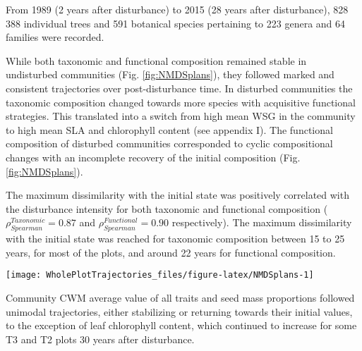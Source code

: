 \documentclass[fleqn,10pt]{ArtEcoFoG} %
\begin{document}
From 1989 (2 years after disturbance) to 2015 (28 years after
disturbance), 828 388 individual trees and 591 botanical species
pertaining to 223 genera and 64 families were recorded.

While both taxonomic and functional composition remained stable in
undisturbed communities (Fig. \ref{fig:NMDSplans}), they followed marked
and consistent trajectories over post-\break disturbance time. In
disturbed communities the taxonomic composition changed towards more
species with acquisitive functional strategies. This translated into a
switch from high mean WSG in the community to high mean SLA and
chlorophyll content (see appendix I). The functional composition of
disturbed communities corresponded to cyclic compositional changes with
an incomplete recovery of the initial composition (Fig.
\ref{fig:NMDSplans}).

The maximum dissimilarity with the initial state was positively
correlated with the disturbance intensity for both taxonomic and
functional composition (\(\rho_{Spearman}^{Taxonomic}=0.87\) and
\(\rho_{Spearman}^{Functional}=0.90\) respectively). The maximum
dissimilarity with the initial state was reached for taxonomic
composition between 15 to 25 years, for most of the plots, and around 22
years for functional composition.

\begin{figure*}

{\centering \texttt{[image: WholePlotTrajectories\_files/figure-latex/NMDSplans-1]} 

}

\caption{Plot trajectories in terms of taxonomic composition (\textbf{(a)} and \textbf{(c)}) and functional composition (\textbf{(b)} and \textbf{(d)}) in a two-dimensional NMDS plane. Lower panels (\textbf{(c)} and \textbf{(d)}) represent the Euclidean distance to initial condition along the 30 sampled years. Shaded areas are the credibility intervals.}\label{fig:NMDSplans}
\end{figure*}

Community CWM average value of all traits and seed mass proportions
followed unimodal trajectories, either stabilizing or returning towards
their initial values, to the exception of leaf chlorophyll content,
which continued to increase for some T3 and T2 plots 30 years after
disturbance.
\end{document}
